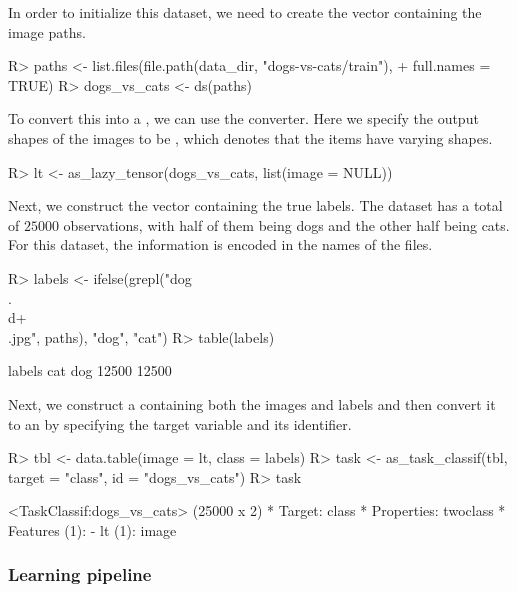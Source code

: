 \documentclass[article]{jss}
\theoremstyle{definition}
\begin{document}
In order to initialize this dataset, we need to create the vector containing the image paths.

\begin{CodeInput}
R> paths <- list.files(file.path(data_dir, "dogs-vs-cats/train"),
+    full.names = TRUE)
R> dogs_vs_cats <- ds(paths)
\end{CodeInput}

To convert this into a , we can use the  converter.
Here we specify the output shapes of the images to be , which denotes that the items have varying shapes.

\begin{CodeInput}
R> lt <- as_lazy_tensor(dogs_vs_cats, list(image = NULL))
\end{CodeInput}

Next, we construct the vector containing the true labels.
The dataset has a total of $25000$ observations, with half of them being dogs and the other half being cats.
For this dataset, the information is encoded in the names of the files.

\begin{CodeInput}
R> labels <- ifelse(grepl("dog\\.\\d+\\.jpg", paths), "dog", "cat")
R> table(labels)
\end{CodeInput}
\begin{CodeOutput}
labels
  cat   dog
12500 12500
\end{CodeOutput}

Next, we construct a  \citep{ref-datatable2024} containing both the images and labels and then convert it to an  by specifying the target variable and its identifier.

\begin{CodeInput}
R> tbl <- data.table(image = lt, class = labels)
R> task <- as_task_classif(tbl, target = "class", id = "dogs_vs_cats")
R> task
\end{CodeInput}
\begin{CodeOutput}
<TaskClassif:dogs_vs_cats> (25000 x 2)
* Target: class
* Properties: twoclass
* Features (1):
  - lt (1): image
\end{CodeOutput}

\subsubsection{Learning pipeline}
\end{document}
